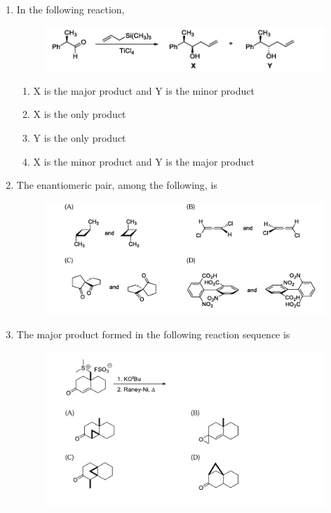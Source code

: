 \documentclass{article}
\begin{document}
\begin{enumerate}
\item In the following reaction, 
\begin{figure}[H]
    \centering
    \includegraphics[width=1\columnwidth]{figures/cy_q26.png}
    \label{fig:placeholder}
\end{figure}
\begin{enumerate}
    \item  X is the major product and Y is the minor product
    \item  X is the only product
    \item  Y is the only product 
    \item  X is the minor product and Y is the major product
\end{enumerate}

\item   The enantiomeric pair, among the following, is
\begin{figure}[H]
    \centering
    \includegraphics[width=0.9\columnwidth]{figures/cy_q27.png}
    \label{fig:placeholder}
\end{figure}

\item The major product formed in the following reaction sequence is
\begin{figure}[H]
    \centering
    \includegraphics[width=1\columnwidth]{figures/cy_q28.png}
    \label{fig:placeholder}
\end{figure}


\end{enumerate}
\end{document}
